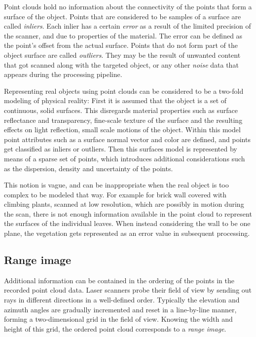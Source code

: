 Point clouds hold no information about the connectivity of the points that form a surface of the object. Points that are considered to be samples of a surface are called \emph{inliers}. Each inlier has a certain \emph{error} as a result of the limited precision of the scanner, and due to properties of the material. The error can be defined as the point's offset from the actual surface. Points that do not form part of the object surface are called \emph{outliers}. They may be the result of unwanted content that got scanned along with the targeted object, or any other \emph{noise} data that appears during the processing pipeline.

Representing real objects using point clouds can be considered to be a two-fold modeling of physical reality: First it is assumed that the object is a set of continuous, solid surfaces. This disregards material properties such as surface reflectance and transparency, fine-scale texture of the surface and the resulting effects on light reflection, small scale motions of the object. Within this model point attributes such as a surface normal vector and color are defined, and points get classified as inliers or outliers. Then this surfaces model is represented by means of a sparse set of points, which introduces additional considerations such as the dispersion, density and uncertainty of the points.

This notion is vague, and can be inappropriate when the real object is too complex to be modeled that way. For example for brick wall covered with climbing plants, scanned at low resolution, which are possibly in motion during the scan, there is not enough information available in the point cloud to represent the surfaces of the individual leaves. When instead considering the wall to be one plane, the vegetation gets represented as an error value in subsequent processing.


\subsection{Range image} \label{sec:range_image}
Additional information can be contained in the ordering of the points in the recorded point cloud data. Laser scanners probe their field of view by sending out rays in different directions in a well-defined order. Typically the elevation and azimuth angles are gradually incremented and reset in a line-by-line manner, forming a two-dimensional grid in the field of view. Knowing the width and height of this grid, the ordered point cloud corresponds to a \emph{range image}.

